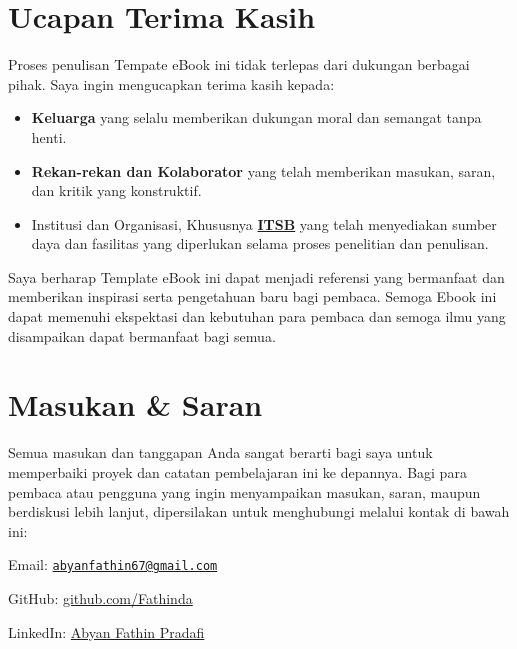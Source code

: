 \documentclass[
  indonesian,
  letterpaper,
]{book}
\providecommand{\tightlist}{%
  \setlength{\itemsep}{0pt}\setlength{\parskip}{0pt}}
\begin{document}
\section*{Ucapan Terima Kasih}\label{ucapan-terima-kasih}


Proses penulisan Tempate eBook ini tidak terlepas dari dukungan berbagai
pihak. Saya ingin mengucapkan terima kasih kepada:

\begin{itemize}
\tightlist
\item
  \textbf{Keluarga} yang selalu memberikan dukungan moral dan semangat
  tanpa henti.
\item
  \textbf{Rekan-rekan dan Kolaborator} yang telah memberikan masukan,
  saran, dan kritik yang konstruktif.
\item
  Institusi dan Organisasi, Khususnya
  \textbf{\href{https://itsb.ac.id/}{ITSB}} yang telah menyediakan
  sumber daya dan fasilitas yang diperlukan selama proses penelitian dan
  penulisan.
\end{itemize}

Saya berharap Template eBook ini dapat menjadi referensi yang bermanfaat
dan memberikan inspirasi serta pengetahuan baru bagi pembaca. Semoga
Ebook ini dapat memenuhi ekspektasi dan kebutuhan para pembaca dan
semoga ilmu yang disampaikan dapat bermanfaat bagi semua.

\section*{Masukan \& Saran}\label{masukan-saran}


Semua masukan dan tanggapan Anda sangat berarti bagi saya untuk
memperbaiki proyek dan catatan pembelajaran ini ke depannya. Bagi para
pembaca atau pengguna yang ingin menyampaikan masukan, saran, maupun
berdiskusi lebih lanjut, dipersilakan untuk menghubungi melalui kontak
di bawah ini:

Email:
\href{mailto:abyanfathin67@gmail.com}{\nolinkurl{abyanfathin67@gmail.com}}

GitHub: \href{https://github.com/Fathinda}{github.com/Fathinda}

LinkedIn:
\href{https://www.linkedin.com/in/abyan-fathin-pradafi-890645328}{Abyan
Fathin Pradafi}
\end{document}
